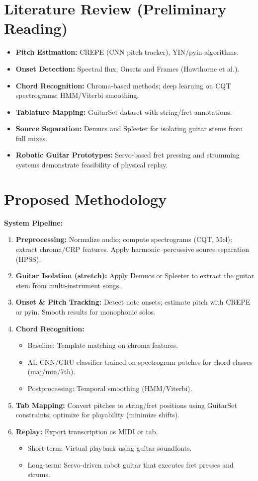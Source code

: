 \documentclass[11pt]{article}
\begin{document}
\section*{Literature Review (Preliminary Reading)}
\begin{itemize}[leftmargin=*,itemsep=2pt]
  \item \textbf{Pitch Estimation:} CREPE (CNN pitch tracker), YIN/pyin algorithms.
  \item \textbf{Onset Detection:} Spectral flux; Onsets and Frames (Hawthorne et al.).
  \item \textbf{Chord Recognition:} Chroma-based methods; deep learning on CQT spectrograms; HMM/Viterbi smoothing.
  \item \textbf{Tablature Mapping:} GuitarSet dataset with string/fret annotations.
  \item \textbf{Source Separation:} Demucs and Spleeter for isolating guitar stems from full mixes.
  \item \textbf{Robotic Guitar Prototypes:} Servo-based fret pressing and strumming systems demonstrate feasibility of physical replay.
\end{itemize}

\section*{Proposed Methodology}
\textbf{System Pipeline:}
\begin{enumerate}[leftmargin=*,itemsep=3pt]
  \item \textbf{Preprocessing:} Normalize audio; compute spectrograms (CQT, Mel); extract chroma/CRP features. Apply harmonic--percussive source separation (HPSS).
  \item \textbf{Guitar Isolation (stretch):} Apply Demucs or Spleeter to extract the guitar stem from multi-instrument songs.
  \item \textbf{Onset \& Pitch Tracking:} Detect note onsets; estimate pitch with CREPE or pyin. Smooth results for monophonic solos.
  \item \textbf{Chord Recognition:} 
    \begin{itemize}[itemsep=1pt]
      \item Baseline: Template matching on chroma features.
      \item AI: CNN/GRU classifier trained on spectrogram patches for chord classes (maj/min/7th).
      \item Postprocessing: Temporal smoothing (HMM/Viterbi).
    \end{itemize}
  \item \textbf{Tab Mapping:} Convert pitches to string/fret positions using GuitarSet constraints; optimize for playability (minimize shifts).
  \item \textbf{Replay:} Export transcription as MIDI or tab. 
    \begin{itemize}
      \item Short-term: Virtual playback using guitar soundfonts.
      \item Long-term: Servo-driven robot guitar that executes fret presses and strums.
    \end{itemize}
\end{enumerate}
\end{document}
